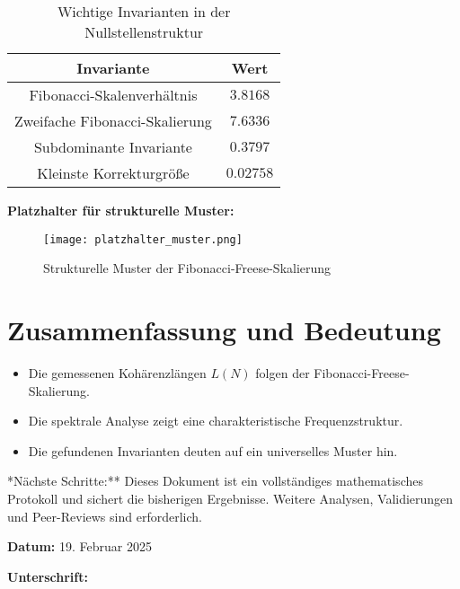 \documentclass[a4paper,12pt]{article}
\begin{document}
\begin{table}[h]
    \centering
    \renewcommand{\arraystretch}{1.4}
    \begin{tabular}{c c}
        \toprule
        \textbf{Invariante} & \textbf{Wert} \\
        \midrule
        Fibonacci-Skalenverhältnis & \( 3.8168 \) \\
        Zweifache Fibonacci-Skalierung & \( 7.6336 \) \\
        Subdominante Invariante & \( 0.3797 \) \\
        Kleinste Korrekturgröße & \( 0.02758 \) \\
        \bottomrule
    \end{tabular}
    \caption{Wichtige Invarianten in der Nullstellenstruktur}
\end{table}

\vspace{0.5cm}
\noindent \textbf{Platzhalter für strukturelle Muster:}

\begin{figure}[h]
    \centering
    \texttt{[image: platzhalter\_muster.png]}
    \caption{Strukturelle Muster der Fibonacci-Freese-Skalierung}
    \label{fig:muster}
\end{figure}

\newpage

\section{Zusammenfassung und Bedeutung}
\begin{itemize}
    \item Die gemessenen Kohärenzlängen \( L(N) \) folgen der Fibonacci-Freese-Skalierung.
    \item Die spektrale Analyse zeigt eine charakteristische Frequenzstruktur.
    \item Die gefundenen Invarianten deuten auf ein universelles Muster hin.
\end{itemize}

\vspace{1cm}

\noindent **Nächste Schritte:**  
Dieses Dokument ist ein vollständiges mathematisches Protokoll und sichert die bisherigen Ergebnisse. Weitere Analysen, Validierungen und Peer-Reviews sind erforderlich.

\vspace{1cm}

\noindent \textbf{Datum:} 19. Februar 2025

\vspace{1cm}

\noindent \textbf{Unterschrift:} \underline{\hspace{5cm}}
\end{document}
